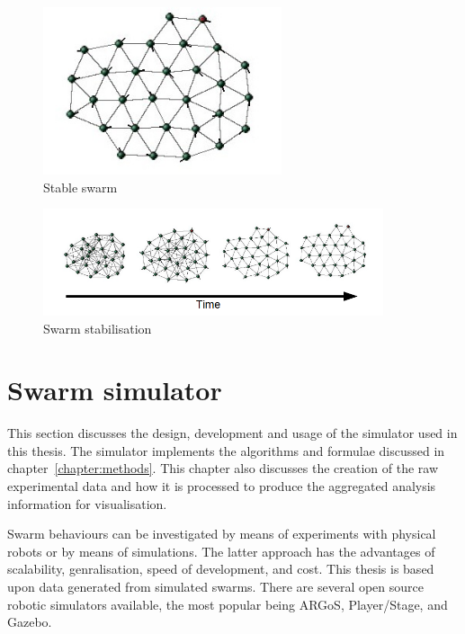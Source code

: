 \begin{figure}[H]
\begin{center}
\includegraphics[width=7cm]{CHAPTER-2/figures/Stable}
\end{center}
\caption{Stable swarm\label{methods:Stable1}}
\end{figure}

\begin{figure}[H]
\begin{center}
\includegraphics[width=10cm]{CHAPTER-2/figures/StableTime}
\end{center}
\caption{Swarm stabilisation\label{methods:StableTime1}}
\end{figure}

\section{Swarm simulator}\label{chapter:simulator}
This section discusses the design, development and usage of the simulator used in this thesis. The simulator implements the algorithms and formulae discussed in chapter~\ref{chapter:methods}. This chapter also discusses the creation of the raw experimental data and how it is processed to produce the aggregated analysis information for visualisation.

Swarm behaviours can be investigated by means of experiments with physical robots or by means of simulations. The latter approach has the advantages of scalability, genralisation, speed of development, and cost. This thesis is based upon data generated from simulated swarms. There are several open source robotic simulators available, the most popular being ARGoS, Player/Stage, and Gazebo.

